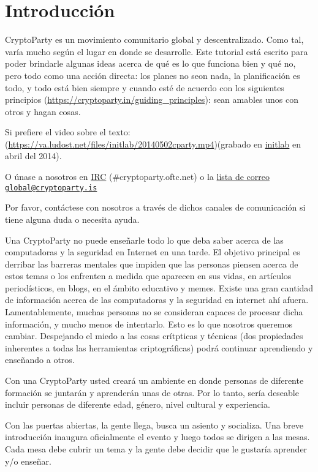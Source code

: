 \documentclass[10pt,a5paper,twoside,,]{book}
\begin{document}
\section{Introducción}\label{introducciuxf3n}

CryptoParty es un movimiento comunitario global y descentralizado. Como
tal, varía mucho según el lugar en donde se desarrolle. Este tutorial
está escrito para poder brindarle algunas ideas acerca de qué es lo que
funciona bien y qué no, pero todo como una acción directa: los planes no
seon nada, la planificación es todo, y todo está bien siempre y cuando
esté de acuerdo con los siguientes principios
(\url{https://cryptoparty.in/guiding_principles}): sean amables unos con
otros y hagan cosas.

Si prefiere el video sobre el texto:
(\url{https://va.ludost.net/files/initlab/20140502cparty.mp4})(grabado
en \href{https://initlab.org}{initlab} en abril del 2014).

O únase a nosotros en
\href{https://cryptoparty.in/connect/contact/irc}{IRC}
(\#cryptoparty.oftc.net) o la
\href{https://cryptoparty.in/connect/contact/mailinglists}{lista de
correo}
\href{mailto:global@cryptoparty.is}{\nolinkurl{global@cryptoparty.is}}

Por favor, contáctese con nosotros a través de dichos canales de
comunicación si tiene alguna duda o necesita ayuda.

Una CryptoParty no puede enseñarle todo lo que deba saber acerca de las
computadoras y la seguridad en Internet en una tarde. El objetivo
principal es derribar las barreras mentales que impiden que las personas
piensen acerca de estos temas o los enfrenten a medida que aparecen en
sus vidas, en artículos periodísticos, en blogs, en el ámbito educativo
y memes. Existe una gran cantidad de información acerca de las
computadoras y la seguridad en internet ahí afuera. Lamentablemente,
muchas personas no se consideran capaces de procesar dicha información,
y mucho menos de intentarlo. Esto es lo que nosotros queremos cambiar.
Despejando el miedo a las cosas crítpticas y técnicas (dos propiedades
inherentes a todas las herramientas criptográficas) podrá continuar
aprendiendo y enseñando a otros.

Con una CryptoParty usted creará un ambiente en donde personas de
diferente formación se juntarán y aprenderán unas de otras. Por lo
tanto, sería deseable incluir personas de diferente edad, género, nivel
cultural y experiencia.

Con las puertas abiertas, la gente llega, busca un asiento y socializa.
Una breve introducción inaugura oficialmente el evento y luego todos se
dirigen a las mesas. Cada mesa debe cubrir un tema y la gente debe
decidir que le gustaría aprender y/o enseñar.
\end{document}
